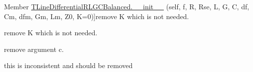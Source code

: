 \begin{DoxyRefList}
%
Member \hyperlink{classSignalIntegrity_1_1SParameters_1_1Devices_1_1TLineDifferentialRLGCBalanced_1_1TLineDifferentialRLGCBalanced_a487b1dcd331b164ab28d7a15e7da47d0}{T\+Line\+Differential\+R\+L\+G\+C\+Balanced.\+\_\+\+\_\+init\+\_\+\+\_\+} (self, f, R, Rse, L, G, C, df, Cm, dfm, Gm, Lm, Z0, K=0)]remove K which is not needed.  
\item[\label{todo__todo000012}%
\Hypertarget{todo__todo000012}%
Member \hyperlink{classSignalIntegrity_1_1SParameters_1_1Devices_1_1TLineDifferentialRLGCUncoupled_1_1TLineDifferentialRLGCUncoupled_aa6650052dc2b466ac52639326346b20a}{T\+Line\+Differential\+R\+L\+G\+C\+Uncoupled.\+\_\+\+\_\+init\+\_\+\+\_\+} (self, f, Rp, Rsep, Lp, Gp, Cp, dfp, Rn, Rsen, Ln, Gn, Cn, dfn, Z0, K=0)]remove K which is not needed.  
\item[\label{todo__todo000019}%
\Hypertarget{todo__todo000019}%
Member \hyperlink{classSignalIntegrity_1_1TimeDomain_1_1Waveform_1_1Waveform_1_1Waveform_a146047cad8b2b4a9acc03e536eecf656}{Waveform.Derivative} (self, c=0., remove\+Point=True, scale=True)]remove argument c.  
\item[\label{todo__todo000018}%
\Hypertarget{todo__todo000018}%
Member \hyperlink{classSignalIntegrity_1_1TimeDomain_1_1Waveform_1_1Waveform_1_1Waveform_a2410e463585763a64dcd8dfe62528134}{Waveform.Offset\+By} (self, v)]this is inconsistent and should be removed 
\end{DoxyRefList}